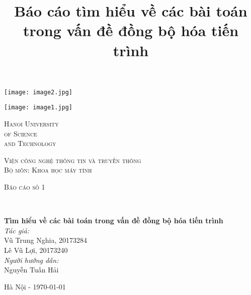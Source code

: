 \documentclass[12pt]{article}
\title{Báo cáo tìm hiểu về các bài toán trong vấn đề đồng bộ hóa tiến trình}
\begin{document}

\thispagestyle{firststyle}
\begin{center}
  \begin{minipage}{0.48\textwidth} \begin{flushleft}
  \texttt{[image: image2.jpg]}
  \end{flushleft}\end{minipage}
  \begin{minipage}{0.48\textwidth} \begin{flushright}
    \texttt{[image: image1.jpg]}
  \end{flushright}\end{minipage}

  \vspace*{-2.5cm}
  \textsc{\huge Hanoi University \\
  \vspace{5px} of Science \\
  \vspace{15px} and Technology}\\

  \vspace*{1.5cm}

  \textsc{\LARGE Viện công nghệ thông tin và truyền thông}\\[1.5cm]
  \textsc{\LARGE Bộ môn: Khoa học máy tính}\\[1.5cm]

  \begin{minipage}{0.9\textwidth} 
    \begin{center}
      \textsc{\LARGE Báo cáo số 1}
    \end{center}
  \end{minipage}\\[0.5cm]
  
  \vspace*{1cm}

  { \huge \bfseries Tìm hiểu về các bài toán trong vấn đề đồng bộ hóa tiến trình}\\[0.4cm]	
  \vspace*{1cm}
  { \large 
    \emph{Tác giả:} \\	
      Vũ Trung Nghia, 20173284 \\
      Lê Vũ Lợi, 20173240 \\
    \vspace*{0.5cm}
    \emph{Người hướng dẫn:} \\													  
      Nguyễn Tuấn Hải \\
  }


  \vspace{2cm} 	
  \begin{center}
    {Hà Nội - \today}
  \end{center}
  
\end{center}
\end{document}

